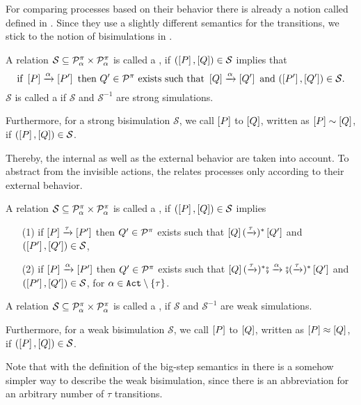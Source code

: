 For comparing processes based on their behavior there is already a notion called  defined in \cite{milnerParrowWalker}. Since they use a slightly different semantics for the transitions, we stick to the notion of bisimulations in \cite{sangiorgi}.

\begin{definition}
\label{def_strong_sim_bisim}
A relation $\mathcal{S}\subseteq\mathcal P^{\pi}_\alpha\times\mathcal P^{\pi}_\alpha$ is called a , if $(\left[P\right],\left[Q\right])\in\mathcal{S}$ implies that
\[\text{if } \left[P\right]\xrightarrow{\alpha}\left[P'\right] \text{ then }Q'\in\mathcal P^{\pi} \text{ exists such that } \left[Q\right]\xrightarrow{\alpha}\left[Q'\right] \text{ and } (\left[P'\right],\left[Q'\right])\in\mathcal{S}.\]
$\mathcal{S}$ is called a  if $\mathcal{S}$ and $\mathcal{S}^{-1}$ are strong simulations.

Furthermore, for a strong bisimulation $\mathcal{S}$, we call $\left[P\right]$  to $\left[Q\right]$, written as $\left[P\right]\sim\left[Q\right]$, if $(\left[P\right],\left[Q\right])\in\mathcal{S}$.
\end{definition}

Thereby, the internal as well as the external behavior are taken into account. To abstract from the invisible actions, the  relates processes only according to their external behavior.

\begin{definition}
\label{def_weak_sim_bisim}
A relation $\mathcal{S}\subseteq\mathcal P^{\pi}_\alpha\times\mathcal P^{\pi}_\alpha$ is called a , if $(\left[P\right],\left[Q\right])\in\mathcal{S}$ implies 
\begin{itemize}%
\item[(1)] if $\left[P\right]\xrightarrow{\tau}\left[P'\right]$ then $Q'\in\mathcal P^{\pi}$ exists such that $\left[Q\right](\xrightarrow{\tau})^*\left[Q'\right]$ and $(\left[P'\right],\left[Q'\right])\in\mathcal{S}$,
\item[(2)] if $\left[P\right]\xrightarrow{\alpha}\left[P'\right]$ then $Q'\in\mathcal P^{\pi}$ exists such that $\left[Q\right](\xrightarrow{\tau})^*\fatsemi\xrightarrow{\alpha}\fatsemi(\xrightarrow{\tau})^*\left[Q'\right]$ and $(\left[P'\right],\left[Q'\right])\in\mathcal{S}$, for $\alpha\in\actions\setminus\set{\tau}$.
\end{itemize}
A relation $\mathcal{S}\subseteq\mathcal P^{\pi}_\alpha\times\mathcal P^{\pi}_\alpha$ is called a , if $\mathcal{S}$ and $\mathcal{S}^{-1}$ are weak simulations.

Furthermore, for a weak bisimulation $\mathcal{S}$, we call $\left[P\right]$  to $\left[Q\right]$, written as $\left[P\right]\approx\left[Q\right]$, if $(\left[P\right],\left[Q\right])\in\mathcal{S}$.
\end{definition}
Note that with the definition of the big-step semantics in  there is a somehow simpler way to describe the weak bisimulation, since there is an abbreviation for an arbitrary number of $\tau$ transitions.

\newpage %
